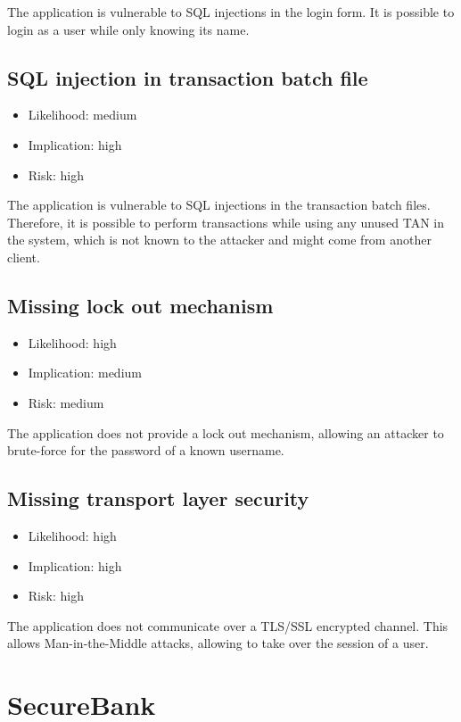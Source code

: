 The application is vulnerable to SQL injections in the login form. It is possible to login as a user while only knowing its name.

\subsection{SQL injection in transaction batch file}
\begin{itemize}
	\item Likelihood: medium
	\item Implication: high
	\item Risk: high
\end{itemize}

The application is vulnerable to SQL injections in the transaction batch files. Therefore, it is possible to perform transactions while using any unused TAN in the system, which is not known to the attacker and might come from another client.

\subsection{Missing lock out mechanism}
\begin{itemize}
	\item Likelihood: high
	\item Implication: medium
	\item Risk: medium
\end{itemize}

The application does not provide a lock out mechanism, allowing an attacker to brute-force for the password of a known username.

\subsection{Missing transport layer security}
\begin{itemize}
	\item Likelihood: high
	\item Implication: high
	\item Risk: high
\end{itemize}

The application does not communicate over a TLS/SSL encrypted channel. This allows Man-in-the-Middle attacks, allowing to take over the session of a user.

\section{SecureBank}

